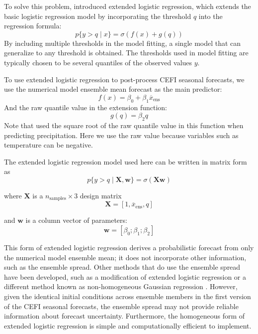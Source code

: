 \documentclass[12pt]{article}
\begin{document}
To solve this problem, \citet{Wilks2009} introduced extended logistic regression,
which extends the basic logistic regression model by incorporating
the threshold $q$ into the regression formula:
\begin{equation}
    p\{y > q \mid x\} = \sigma(f(x) + g(q))
\end{equation}
By including multiple thresholds in the model fitting,
a single model that can generalize to any threshold is obtained.
The thresholds used in model fitting are typically chosen to be several
quantiles of the observed values $y$.

To use extended logistic regression to post-process CEFI
seasonal forecasts, we use the numerical model ensemble mean
forecast as the main predictor:
\begin{equation}
    f(x) = \beta_0 + \beta_1 \overline{x}_{\textrm{ens}}
\end{equation}
And the raw quantile value in the extension function:
\begin{equation}
    g(q) = \beta_2 q
\end{equation}
Note that \citet{Wilks2009} used the square root of the raw quantile value in this function when predicting precipitation. Here we use
the raw value because variables such as temperature can be negative.

The extended logistic regression model used here can be written in matrix form as
\begin{equation}
    p \{y > q \mid \mathbf{X}, \mathbf{w} \} = \sigma(\mathbf{X w})
    \label{eqn:elr}
\end{equation}

where $\mathbf{X}$ is a $n_{\textrm{samples}} \times 3$ design matrix
\begin{equation}
    \mathbf{X} = [1, \overline{x}_{\textrm{ens}}, q]
\end{equation}

and $ \mathbf{w} $ is a column vector of parameters:
\begin{equation}
    \mathbf{w} = [\beta_0; \beta_1; \beta_2]
\end{equation}

This form of extended logistic regression derives a probabilistic
forecast from only the numerical model ensemble mean; it does not incorporate other information,
such as the ensemble spread.
Other methods that do use the ensemble spread have been developed,
such as a modification of extended logistic regression \citep{Messner2014}
or a different method known as non-homogeneous Gaussian regression \citep{Gneiting2005}.
However, given the identical initial conditions across ensemble members
in the first version of the CEFI seasonal forecasts, the ensemble spread
may not provide reliable information about forecast uncertainty.
Furthermore, the homogeneous form of extended logistic regression
is simple and computationally efficient to implement.
\end{document}
